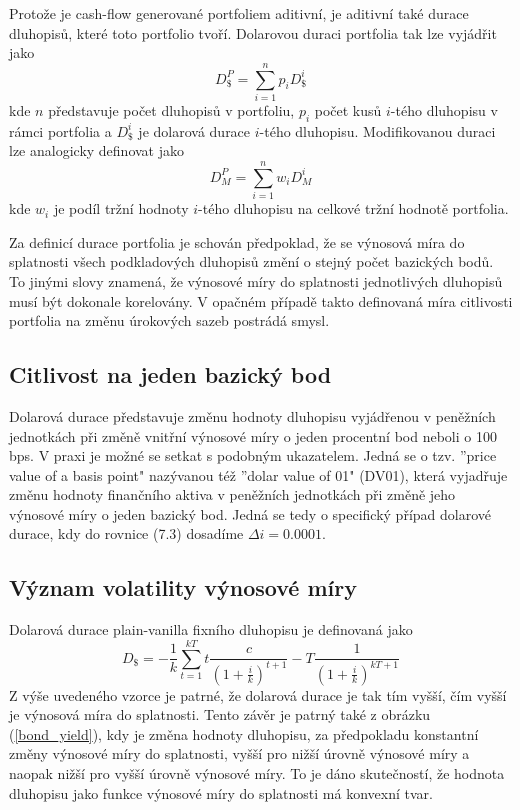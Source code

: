 \documentclass[a4paper]{book}
\begin{document}
Protože je cash-flow generované portfoliem aditivní, je aditivní také durace dluhopisů, které toto portfolio tvoří. Dolarovou duraci portfolia tak lze vyjádřit jako
\begin{equation*}
D_{\$}^P = \sum_{i = 1}^n p_i D_{\$}^i
\end{equation*}
kde $n$ představuje počet dluhopisů v portfoliu, $p_i$ počet kusů $i$-tého dluhopisu v rámci portfolia a $D_{\$}^i$ je dolarová durace $i$-tého dluhopisu. Modifikovanou duraci lze analogicky definovat jako
\begin{equation*}
D_M^P = \sum_{i = 1}^n w_i D_M^i
\end{equation*}
kde $w_i$ je podíl tržní hodnoty $i$-tého dluhopisu na celkové tržní hodnotě portfolia.

Za definicí durace portfolia je schován předpoklad, že se výnosová míra do splatnosti všech podkladových dluhopisů změní o stejný počet bazických bodů. To jinými slovy znamená, že výnosové míry do splatnosti jednotlivých dluhopisů musí být dokonale korelovány. V opačném případě takto definovaná míra citlivosti portfolia na změnu úrokových sazeb postrádá smysl.

\subsection{Citlivost na jeden bazický bod}

Dolarová durace představuje změnu hodnoty dluhopisu vyjádřenou v peněžních jednotkách při změně vnitřní výnosové míry o jeden procentní bod neboli o 100 bps. V praxi je možné se setkat s podobným ukazatelem. Jedná se o tzv. ''price value of a basis point" nazývanou též ''dolar value of 01" (DV01), která vyjadřuje změnu hodnoty finančního aktiva v peněžních jednotkách při změně jeho výnosové míry o jeden bazický bod. Jedná se tedy o specifický případ dolarové durace, kdy do rovnice (7.3) dosadíme $\Delta i = 0.0001$.

\subsection{Význam volatility výnosové míry}

Dolarová durace plain-vanilla fixního dluhopisu je definovaná jako
\begin{equation*}
D_{\$} = -\frac{1}{k} \sum_{t=1}^{kT} t\frac{c}{(1 + \frac{i}{k})^{t+1}} - T\frac{1}{(1 + \frac{i}{k})^{kT + 1}}
\end{equation*}
Z výše uvedeného vzorce je patrné, že dolarová durace je tak tím vyšší, čím vyšší je výnosová míra do splatnosti. Tento závěr je patrný také z obrázku (\ref{bond_yield}), kdy je změna hodnoty dluhopisu, za předpokladu konstantní změny výnosové míry do splatnosti, vyšší pro nižší úrovně výnosové míry a naopak nižší pro vyšší úrovně výnosové míry. To je dáno skutečností, že hodnota dluhopisu jako funkce výnosové míry do splatnosti má konvexní tvar.
\end{document}
